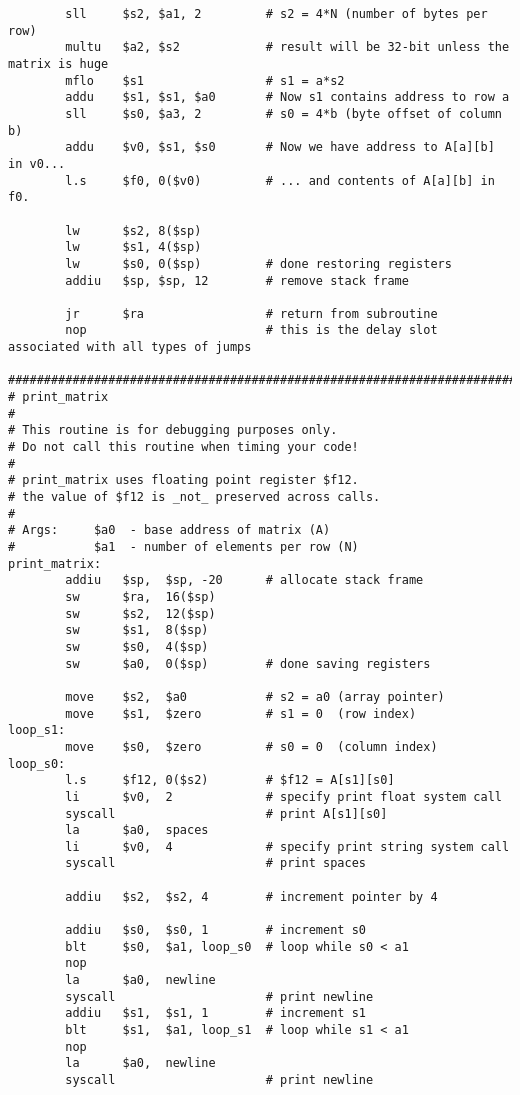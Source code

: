 \begin{verbatim}
        sll     $s2, $a1, 2         # s2 = 4*N (number of bytes per row)
        multu   $a2, $s2            # result will be 32-bit unless the matrix is huge
        mflo    $s1                 # s1 = a*s2
        addu    $s1, $s1, $a0       # Now s1 contains address to row a
        sll     $s0, $a3, 2         # s0 = 4*b (byte offset of column b)
        addu    $v0, $s1, $s0       # Now we have address to A[a][b] in v0...
        l.s     $f0, 0($v0)         # ... and contents of A[a][b] in f0.
        
        lw      $s2, 8($sp)
        lw      $s1, 4($sp)
        lw      $s0, 0($sp)         # done restoring registers
        addiu   $sp, $sp, 12        # remove stack frame
        
        jr      $ra                 # return from subroutine
        nop                         # this is the delay slot associated with all types of jumps

################################################################################
# print_matrix
#
# This routine is for debugging purposes only. 
# Do not call this routine when timing your code!
#
# print_matrix uses floating point register $f12.
# the value of $f12 is _not_ preserved across calls.
#
# Args:     $a0  - base address of matrix (A)
#           $a1  - number of elements per row (N) 
print_matrix:
        addiu   $sp,  $sp, -20      # allocate stack frame
        sw      $ra,  16($sp)
        sw      $s2,  12($sp)
        sw      $s1,  8($sp)
        sw      $s0,  4($sp) 
        sw      $a0,  0($sp)        # done saving registers

        move    $s2,  $a0           # s2 = a0 (array pointer)
        move    $s1,  $zero         # s1 = 0  (row index)
loop_s1:
        move    $s0,  $zero         # s0 = 0  (column index)
loop_s0:
        l.s     $f12, 0($s2)        # $f12 = A[s1][s0]
        li      $v0,  2             # specify print float system call
        syscall                     # print A[s1][s0]
        la      $a0,  spaces
        li      $v0,  4             # specify print string system call
        syscall                     # print spaces

        addiu   $s2,  $s2, 4        # increment pointer by 4

        addiu   $s0,  $s0, 1        # increment s0
        blt     $s0,  $a1, loop_s0  # loop while s0 < a1
        nop
        la      $a0,  newline
        syscall                     # print newline
        addiu   $s1,  $s1, 1        # increment s1
        blt     $s1,  $a1, loop_s1  # loop while s1 < a1
        nop
        la      $a0,  newline
        syscall                     # print newline


\end{verbatim}
